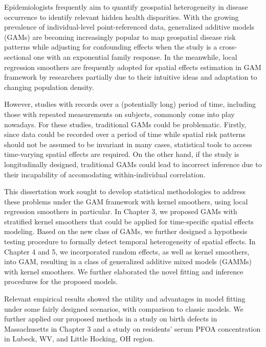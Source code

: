 \thesisabstract
{
  Epidemiologists frequently aim to quantify geospatial heterogeneity in disease occurrence to identify relevant hidden health disparities. With the growing prevalence of individual-level point-referenced data, generalized additive models (GAMs) are becoming increasingly popular to map geospatial disease risk patterns while adjusting for confounding effects when the study is a cross-sectional one with an exponential family response. In the meanwhile, local regression smoothers are frequently adopted for spatial effects estimation in GAM framework by researchers partially due to their intuitive ideas and adaptation to changing population density.
  
  However, studies with records over a (potentially long) period of time, including those with repeated measurements on subjects, commonly come into play nowadays. For these studies, traditional GAMs could be problematic. Firstly, since data could be recorded over a period of time while spatial risk patterns should not be assumed to be invariant in many cases, statistical tools to access time-varying spatial effects are required. On the other hand, if the study is longitudinally designed, traditional GAMs could lead to incorrect inference due to their incapability of accomodating within-individual correlation. 
  
  This dissertation work sought to develop statistical methodologies to address these problems under the GAM framework with kernel smoothers, using local regression smoothers in particular. In Chapter 3, we proposed GAMs with stratified kernel smoothers that could be applied for time-specific spatial effects modeling. Based on the new class of GAMs, we further designed a hypothesis testing procedure to formally detect temporal heterogeneity of spatial effects. In Chapter 4 and 5, we incorporated random effects, as well as kernel smoothers, into GAM, resulting in a class of generalized additive mixed models (GAMMs) with kernel smoothers. We further elaborated the novel fitting and inference procedures for the proposed models.  
  
  Relevant empirical results showed the utility and advantages in model fitting under some fairly designed scenarios, with comparison to classic models. We further applied our proposed methods in a study on birth defects in Massachusetts in Chapter 3 and a study on residents' serum PFOA concentration in Lubeck, WV, and Little Hocking, OH region. 
}


